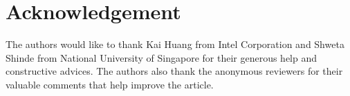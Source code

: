 \documentclass[journal,twocolumn,letterpaper,10pt]{IEEEtran}
\begin{document}
\section*{Acknowledgement}

The authors would like to thank Kai Huang from Intel Corporation and Shweta Shinde from National University of Singapore for their generous help and constructive advices. The authors also thank the anonymous reviewers for their valuable comments that help improve the article.



\end{document}
